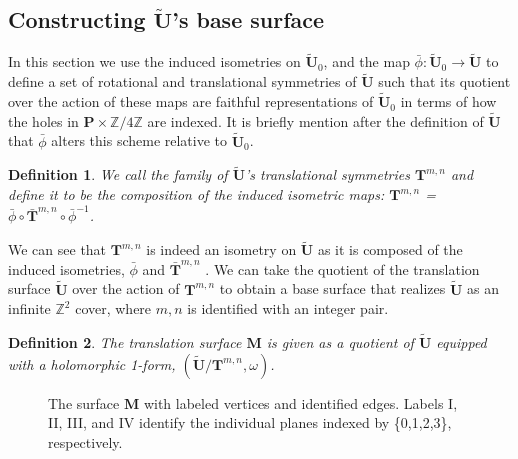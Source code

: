 \documentclass[]{article}
\newtheorem{Def}{Definition}[section]
\begin{document}

\subsection{Constructing $\tilde{\mathbf{U}}$'s base surface}
In this section we use the induced isometries on $\tilde{\mathbf{U}}_0$, and the map $\bar{\phi}:\tilde{\mathbf{U}}_0\rightarrow\tilde{\mathbf{U}}$ to define a set of rotational and translational symmetries of $\tilde{\mathbf{U}}$ such that its quotient over the action of these maps are faithful representations of $\tilde{\mathbf{U}}_0$ in terms of how the holes in $\mathbf{P}\times\mathbb{Z}/4\mathbb{Z}$ are indexed. It is briefly mention after the definition of $\tilde{\mathbf{U}}$ that $\bar{\phi}$ alters this scheme relative to $\tilde{\mathbf{U}}_0$. 

\begin{Def}We call the {family of $\tilde{\mathbf{U}}$'s translational symmetries} $\mathbf{T}^{m,n}$ and define it to be the composition of the induced isometric maps: $\mathbf{T}^{m,n}$ = $\bar{\phi}\circ\bar{\mathbf{T}}^{m,n}\circ\bar{\phi}^{-1}$.
\end{Def}

We can see that $\mathbf{T}^{m,n}$ is indeed an isometry on $\tilde{\mathbf{U}}$ as it is composed of the induced isometries, $\bar{\phi}$ and $\bar{\mathbf{T}}^{m,n}$ . We can take the quotient of the translation surface $\tilde{\mathbf{U}}$ over the action of $\mathbf{T}^{m,n}$ to obtain a base surface that realizes $\tilde{\mathbf{U}}$ as an infinite $\mathbb{Z}^2$ cover, where $m,n$ is identified with an integer pair.

\begin{Def}
The translation surface $\mathbf{M}$ is given as a quotient of $\tilde{\mathbf{U}}$ equipped with a  holomorphic 1-form, $(\tilde{\mathbf{U}}/\mathbf{T}^{m,n},\omega)$.
\end{Def} 

\begin{figure}[H]
\centering

\caption{The surface $\mathbf{M}$ with labeled vertices and identified edges. Labels I, II, III, and IV identify the individual planes indexed by \{0,1,2,3\}, respectively.}
\label{fig:mtilda}
\end{figure}
\end{document}
